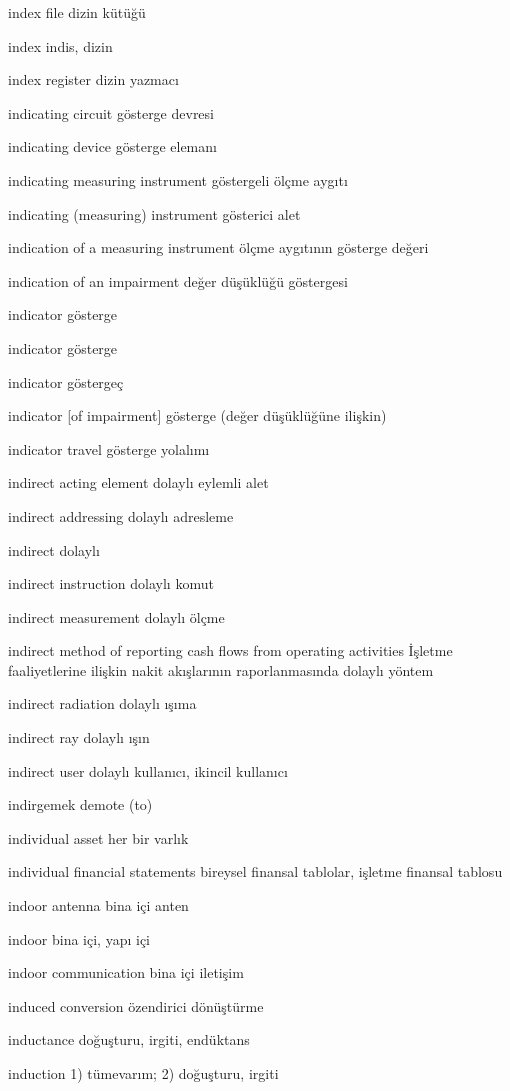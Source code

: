 \documentclass[12pt,fleqn]{article}\usepackage{../../common}
\begin{document}
index file dizin kütüğü

index indis, dizin

index register dizin yazmacı

indicating circuit gösterge devresi

indicating device gösterge elemanı

indicating measuring instrument göstergeli ölçme aygıtı

indicating (measuring) instrument gösterici alet

indication of a measuring instrument ölçme aygıtının gösterge değeri

indication of an impairment değer düşüklüğü göstergesi

indicator gösterge

indicator gösterge

indicator göstergeç

indicator [of impairment] gösterge (değer düşüklüğüne ilişkin)

indicator travel gösterge yolalımı

indirect acting element dolaylı eylemli alet

indirect addressing dolaylı adresleme

indirect dolaylı

indirect instruction dolaylı komut

indirect measurement dolaylı ölçme

indirect method of reporting cash flows from operating activities İşletme faaliyetlerine ilişkin nakit akışlarının raporlanmasında dolaylı yöntem

indirect radiation dolaylı ışıma

indirect ray dolaylı ışın

indirect user dolaylı kullanıcı, ikincil kullanıcı

indirgemek demote (to)

individual asset her bir varlık

individual financial statements bireysel finansal tablolar, işletme finansal tablosu

indoor antenna bina içi anten

indoor bina içi, yapı içi

indoor communication bina içi iletişim

induced conversion özendirici dönüştürme

inductance doğuşturu, irgiti, endüktans

induction 1) tümevarım; 2) doğuşturu, irgiti
\end{document}
